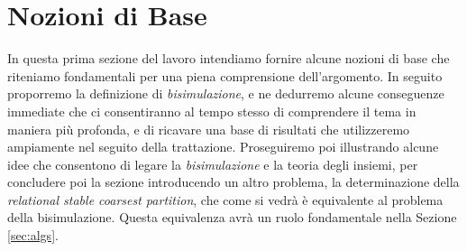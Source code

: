 \section{Nozioni di Base}
\label{sec:base}

In questa prima sezione del lavoro intendiamo fornire alcune nozioni di base che riteniamo fondamentali per una piena comprensione dell'argomento. In seguito proporremo la definizione di \emph{bisimulazione}, e ne dedurremo alcune conseguenze immediate che ci consentiranno al tempo stesso di comprendere il tema in maniera più profonda, e di ricavare una base di risultati che utilizzeremo ampiamente nel seguito della trattazione. Proseguiremo poi illustrando alcune idee che consentono di legare la \emph{bisimulazione} e la teoria degli insiemi, per concludere poi la sezione introducendo un altro problema, la determinazione della \emph{relational stable coarsest partition}, che come si vedrà è equivalente al problema della bisimulazione. Questa equivalenza avrà un ruolo fondamentale nella Sezione \ref{sec:algs}.








